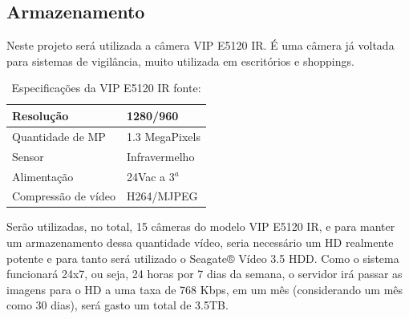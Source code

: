 \subsection{Armazenamento}

	Neste projeto será utilizada a câmera VIP E5120 IR. É uma câmera já voltada para sistemas de vigilância, muito utilizada em escritórios e shoppings.

	\begin{table}[H]
		\centering
		\begin{tabular}{|l|l|}
			\hline
			Resolução           & 1280/960       \\ \hline
			Quantidade de MP    & 1.3 MegaPixels \\ \hline
			Sensor              & Infravermelho  \\ \hline
			Alimentação         & 24Vac a 3$^a$  \\ \hline
			Compressão de vídeo & H264/MJPEG     \\ \hline
		\end{tabular}
		\caption{Especificações da VIP E5120 IR fonte: \cite{mercadoLivreVIPE5120}}
		\label{my-label}
	\end{table}

	Serão utilizadas, no total, 15 câmeras do modelo VIP E5120 IR, e para manter um armazenamento dessa quantidade vídeo, seria necessário um HD realmente potente e para tanto será utilizado o Seagate® Vídeo 3.5 HDD. Como o sistema funcionará  24x7, ou seja, 24 horas por 7 dias da semana, o servidor irá passar as imagens para o HD a uma taxa de 768 Kbps, em um mês (considerando um mês como 30 dias), será gasto um total de 3.5TB.

